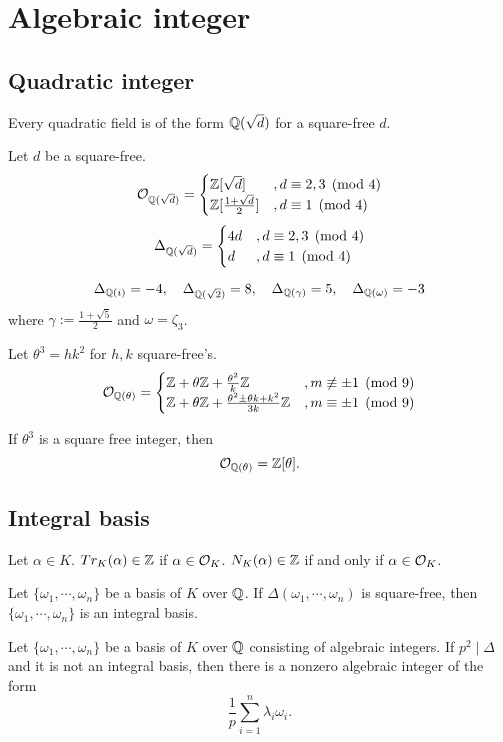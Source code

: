 \documentclass[12pt]{article}
\begin{document}
\section{Algebraic integer}
\subsection{Quadratic integer}
\begin{thm}
Every quadratic field is of the form $\mathbb{Q}(\sqrt d)$ for a square-free $d$.
\end{thm}
\begin{thm}
Let $d$ be a square-free.
\[\mathcal{O}_{\mathbb{Q}(\sqrt d)}=\begin{cases}\mathbb{Z}[\sqrt d]&,d\equiv2,3\pmod4\\\mathbb{Z}[\tfrac{1+\sqrt d}2]&,d\equiv1\pmod4\end{cases}\]
\[\Delta_{\mathbb{Q}(\sqrt d)}=\begin{cases}4d&,d\equiv2,3\pmod4\\ d&,d\equiv1\pmod4\end{cases}\]
\end{thm}
\begin{ex}
\[\Delta_{\mathbb{Q}(i)}=-4,\quad\Delta_{\mathbb{Q}(\sqrt2)}=8,\quad\Delta_{\mathbb{Q}(\gamma)}=5,\quad\Delta_{\mathbb{Q}(\omega)}=-3\]
where $\gamma:=\frac{1+\sqrt5}2$ and $\omega=\zeta_3$.
\end{ex}
\begin{thm}
Let $\theta^3=hk^2$ for $h,k$ square-free's.
\[\mathcal{O}_{\mathbb{Q}(\theta)}=\begin{cases}\mathbb{Z}+\theta\mathbb{Z}+\frac{\theta^2}k\mathbb{Z}&,m\not\equiv\pm1\pmod9\\
\mathbb{Z}+\theta\mathbb{Z}+\frac{\theta^2\pm\theta k+k^2}{3k}\mathbb{Z}&,m\equiv\pm1\pmod9\end{cases}\]
\end{thm}
\begin{cor}
If $\theta^3$ is a square free integer, then
\[\mathcal{O}_{\mathbb{Q}(\theta)}=\mathbb{Z}[\theta].\]
\end{cor}

\subsection{Integral basis}
\begin{thm}
Let $\alpha\in K$.
$Tr_K(\alpha)\in\mathbb{Z}$ if $\alpha\in\mathcal{O}_K$.
$N_K(\alpha)\in\mathbb{Z}$ if and only if $\alpha\in\mathcal{O}_K$.
\end{thm}
\begin{thm}
Let $\{\omega_1,\cdots,\omega_n\}$ be a basis of $K$ over $\mathbb{Q}$.
If $\Delta(\omega_1,\cdots,\omega_n)$ is square-free, then $\{\omega_1,\cdots,\omega_n\}$ is an integral basis.
\end{thm}
\begin{thm}
Let $\{\omega_1,\cdots,\omega_n\}$ be a basis of $K$ over $\mathbb{Q}$ consisting of algebraic integers.
If $p^2\mid\Delta$ and it is not an integral basis, then there is a nonzero algebraic integer of the form
\[\frac1p\sum_{i=1}^n\lambda_i\omega_i.\]
\end{thm}
\end{document}
